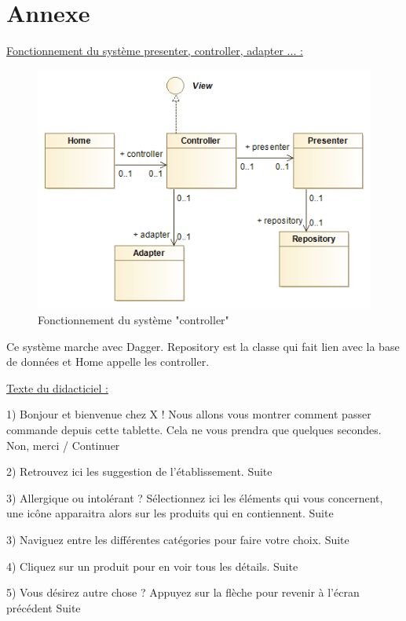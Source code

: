 \chapter{Annexe}
\label{sec:annexe}

\underline{Fonctionnement du système presenter, controller, adapter ... :}

\begin{figure}[!htp]
  \centering
  \includegraphics[width=130mm,scale=0.5]{images/diagramme_conttroller.png}
  \caption{Fonctionnement du système "controller"}
  \label{fig:boat1}
\end{figure}

Ce système marche avec Dagger. Repository est la classe qui fait lien avec la base de données et Home appelle les controller.

\underline{Texte du didacticiel :}

1) Bonjour et bienvenue chez X ! Nous allons vous montrer comment passer commande depuis cette tablette.
Cela ne vous prendra que quelques secondes.
Non, merci / Continuer

2) Retrouvez ici les suggestion de l'établissement.
Suite

3) Allergique ou intolérant ? Sélectionnez ici les éléments qui vous concernent, une icône apparaitra alors sur les produits qui en contiennent.
Suite

3) Naviguez entre les différentes catégories pour faire votre choix.
Suite

4) Cliquez sur un produit pour en voir tous les détails.
Suite

5) Vous désirez autre chose ? Appuyez sur la flèche pour revenir à l'écran précédent
Suite


